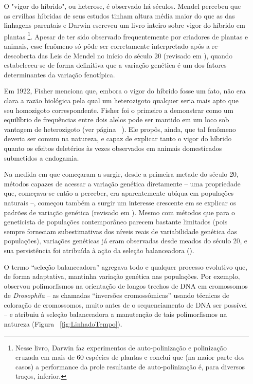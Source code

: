 \begin{refsection}
    O "vigor do híbrido", ou heterose, é observado há séculos. Mendel percebeu que as ervilhas híbridas de seus estudos tinham altura média maior do que as das linhagens parentais \parencite{Crow1987a} e Darwin escreveu um livro inteiro sobre vigor do híbrido em plantas \parencite{Darwin1876}\footnote{Nesse livro, Darwin faz experimentos de auto-polinização e polinização cruzada em mais de 60 espécies de plantas e conclui que (na maior parte dos casos) a performance da prole resultante de auto-polinização é, para diversos traços, inferior.}. Apesar de ter sido observado frequentemente por criadores de plantas e animais, esse fenômeno só pôde ser corretamente interpretado após a re-descoberta das Leis de Mendel no início do século 20 (revisado em \cite{Crow1987a}), quando estabeleceu-se de forma definitiva que a variação genética é um dos fatores determinantes da variação fenotípica.
%

	Em 1922, Fisher \nocite{Fisher1922}menciona que, embora o vigor do híbrido fosse um fato, não era clara a razão biológica pela qual um heterozigoto qualquer seria mais apto que seu homozigoto correspondente. Fisher foi o primeiro a demonstrar como um equilíbrio de frequências entre dois alelos pode ser mantido em um loco sob vantagem de heterozigoto (ver página ~\pageref{sub:PressaoSeletivaConstante}). Ele propôs, ainda, que tal fenômeno deveria ser comum na natureza, e capaz de explicar tanto o vigor do híbrido quanto os efeitos deletérios às vezes observados em animais domesticados submetidos a endogamia. 
%

	Na medida em que começaram a surgir, desde a primeira metade do século 20, métodos capazes de acessar a variação genética diretamente -- uma propriedade que, começava-se então a perceber, era aparentemente ubíqua em populações naturais --, começou também a surgir um interesse crescente em se explicar os padrões de variação genética (revisado em \cite{Bamshad2003,Gloss2016}). Mesmo com métodos que para o geneticista de populações contemporâneo parecem bastante limitados (pois sempre forneciam subestimativas dos níveis reais de variabilidade genética das populações), variações genéticas já eram observadas desde meados do século 20, e sua persistência foi atribuída à ação da seleção balanceadora (\cite{Dobzhansky1937}). 


    O termo \enquote{seleção balanceadora} agregava todo e qualquer processo evolutivo que, de forma adaptativa, mantinha variação genética nas populações. Por exemplo, \textcite{Dobzhansky1937} observou polimorfismos na orientação de longos trechos de DNA em cromossomos de \emph{Drosophila} -- as chamadas \enquote{inversões cromossômicas} usando técnicas de coloração de cromossomos, muito antes de o sequenciamento de DNA ser possível -- e atribuiu à seleção balanceadora a manutenção de tais polimorfismos na natureza (Figura  ~\ref{fig:LinhadoTempo}).
%


\end{refsection}
